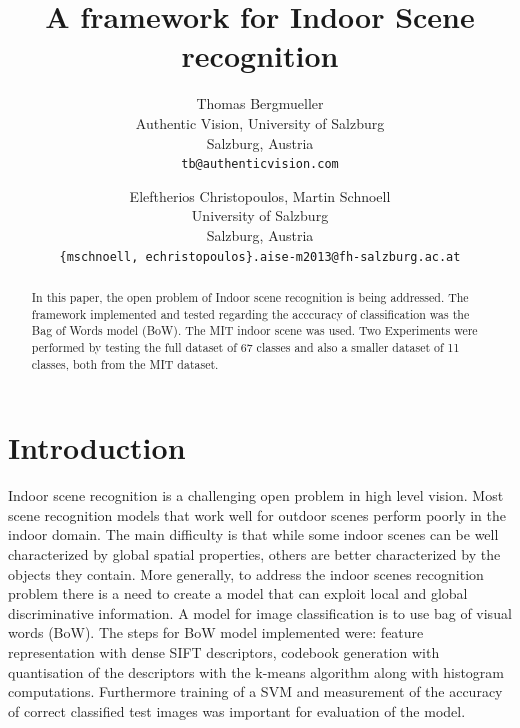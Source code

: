 \documentclass[10pt,twocolumn,letterpaper]{article}
\begin{document}
\title{A framework for Indoor Scene recognition}

\author{Thomas Bergmueller\\
Authentic Vision, University of Salzburg\\
Salzburg, Austria\\
{\tt\small tb@authenticvision.com}
\and
Eleftherios Christopoulos, Martin Schnoell\\
University of Salzburg\\
Salzburg, Austria\\
{\tt\small \{mschnoell, echristopoulos\}.aise-m2013@fh-salzburg.ac.at}
}

\maketitle
\thispagestyle{empty}

\begin{abstract}
   In this paper, the open problem of Indoor scene recognition is being addressed. The framework implemented and tested regarding the acccuracy of classification was the Bag of Words model (BoW). The MIT indoor scene was used. Two Experiments were performed by testing the full dataset of 67 classes and also a smaller dataset of 11 classes, both from the MIT dataset.   
\end{abstract}

\section{Introduction}
Indoor scene recognition is a challenging open problem in high level vision. Most scene recognition models that work well for outdoor scenes perform poorly in the indoor domain. The main difficulty is that while some indoor scenes can be well characterized by global spatial properties, others are better characterized by the objects they contain. More generally, to address the indoor scenes recognition problem there is a need to create a model that can exploit local and global discriminative information.\cite{indoorScenes} A model for image classification is to use bag of visual words (BoW). The steps for BoW model implemented were: feature representation with dense SIFT descriptors, codebook generation with quantisation of the descriptors with the k-means algorithm along with histogram computations. Furthermore training of a SVM and measurement of  the accuracy of correct classified test images was important for evaluation of the model.
\end{document}
